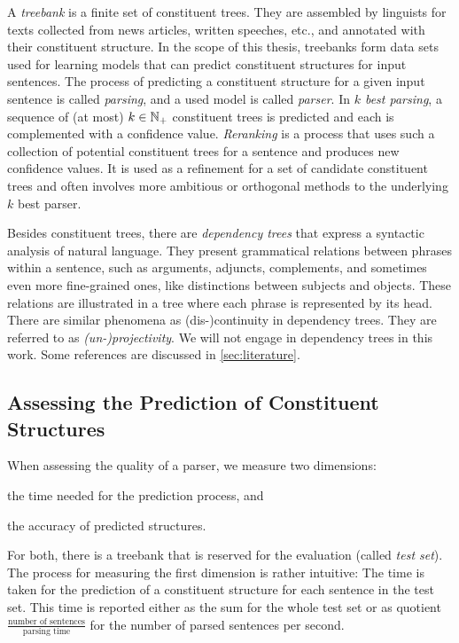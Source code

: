 \documentclass[../document.tex]{subfiles}
\begin{document}
    A \emph{treebank} is a finite set of constituent trees.
    They are assembled by linguists for texts collected from news articles, written speeches, etc., and annotated with their constituent structure.
    In the scope of this thesis, treebanks form data sets used for learning models that can predict constituent structures for input sentences.
    The process of predicting a constituent structure for a given input sentence is called \emph{parsing}, and a used model is called \emph{parser}.
    In \emph{\(k\) best parsing}, a sequence of (at most) \(k \in \mathbb{N}_+\) constituent trees is predicted and each is complemented with a confidence value.
    \emph{Reranking} is a process that uses such a collection of potential constituent trees for a sentence and produces new confidence values.
    It is used as a refinement for a set of candidate constituent trees and often involves more ambitious or orthogonal methods to the underlying \(k\) best parser.

    Besides constituent trees, there are \emph{dependency trees} that express a syntactic analysis of natural language.
    They present grammatical relations between phrases within a sentence, such as arguments, adjuncts, complements, and sometimes even more fine-grained ones, like distinctions between subjects and objects.
    These relations are illustrated in a tree where each phrase is represented by its head.
    There are similar phenomena as (dis-)continuity in dependency trees. They are referred to as \emph{(un-)projectivity}.
    We will not engage in dependency trees in this work. Some references are discussed in \cref{sec:literature}.

    \subsection{Assessing the Prediction of Constituent Structures}
    When assessing the quality of a parser, we measure two dimensions:
    \begin{inparaenum}
        \item the time needed for the prediction process, and
        \item the accuracy of predicted structures.
    \end{inparaenum}
    For both, there is a treebank that is reserved for the evaluation (called \emph{test set}).
    The process for measuring the first dimension is rather intuitive:
        The time is taken for the prediction of a constituent structure for each sentence in the test set.
    This time is reported either as the sum for the whole test set or as quotient \(\frac{\text{number of sentences}}{\text{parsing time}}\) for the number of parsed sentences per second.
\end{document}
